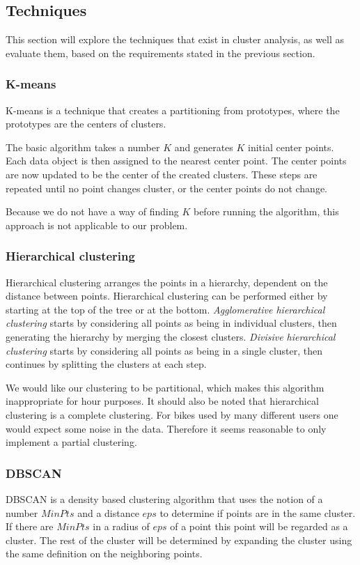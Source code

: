 \subsection{Techniques}
This section will explore the techniques that exist in cluster analysis, as well as evaluate them, based on the requirements stated in the previous section.

\subsubsection{K-means}
K-means is a technique that creates a partitioning from prototypes, where the prototypes are the centers of clusters.

The basic algorithm takes a number $K$ and generates $K$ initial center points.
Each data object is then assigned to the nearest center point.
The center points are now updated to be the center of the created clusters.
These steps are repeated until no point changes cluster, or the center points do not change.

Because we do not have a way of finding $K$ before running the algorithm, this approach is not applicable to our problem.

\subsubsection{Hierarchical clustering}
Hierarchical clustering arranges the points in a hierarchy, dependent on the distance between points.
Hierarchical clustering can be performed either by starting at the top of the tree or at the bottom.
\textit{Agglomerative hierarchical clustering} starts by considering all points as being in individual clusters, then generating the hierarchy by merging the closest clusters.
\textit{Divisive hierarchical clustering} starts by considering all points as being in a single cluster, then continues by splitting the clusters at each step.

We would like our clustering to be partitional, which makes this algorithm inappropriate for hour purposes.
It should also be noted that hierarchical clustering is a complete clustering.
For bikes used by many different users one would expect some noise in the data.
Therefore it seems reasonable to only implement a partial clustering.

\subsubsection{DBSCAN}
DBSCAN is a density based clustering algorithm that uses the notion of a number $ MinPts $ and a distance $ eps $ to determine if points are in the same cluster.
If there are $ MinPts $ in a radius of $ eps $ of a point this point will be regarded as a cluster. 
The rest of the cluster will be determined by expanding the cluster using the same definition on the neighboring points.

